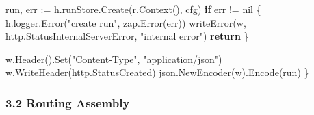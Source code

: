 \documentclass[
]{article}
\newenvironment{Shaded}{}{}
\newcommand{\ControlFlowTok}[1]{\textcolor[rgb]{0.00,0.44,0.13}{\textbf{#1}}}
\newcommand{\NormalTok}[1]{#1}
\newcommand{\OperatorTok}[1]{\textcolor[rgb]{0.40,0.40,0.40}{#1}}
\newcommand{\OtherTok}[1]{\textcolor[rgb]{0.00,0.44,0.13}{#1}}
\newcommand{\StringTok}[1]{\textcolor[rgb]{0.25,0.44,0.63}{#1}}
\begin{document}
\begin{Shaded}
\begin{Highlighting}[]
\NormalTok{    run}\OperatorTok{,}\NormalTok{ err }\OperatorTok{:=}\NormalTok{ h}\OperatorTok{.}\NormalTok{runStore}\OperatorTok{.}\NormalTok{Create}\OperatorTok{(}\NormalTok{r}\OperatorTok{.}\NormalTok{Context}\OperatorTok{(),}\NormalTok{ cfg}\OperatorTok{)}
    \ControlFlowTok{if}\NormalTok{ err }\OperatorTok{!=} \OtherTok{nil} \OperatorTok{\{}
\NormalTok{        h}\OperatorTok{.}\NormalTok{logger}\OperatorTok{.}\NormalTok{Error}\OperatorTok{(}\StringTok{"create run"}\OperatorTok{,}\NormalTok{ zap}\OperatorTok{.}\NormalTok{Error}\OperatorTok{(}\NormalTok{err}\OperatorTok{))}
\NormalTok{        writeError}\OperatorTok{(}\NormalTok{w}\OperatorTok{,}\NormalTok{ http}\OperatorTok{.}\NormalTok{StatusInternalServerError}\OperatorTok{,} \StringTok{"internal error"}\OperatorTok{)}
        \ControlFlowTok{return}
    \OperatorTok{\}}

\NormalTok{    w}\OperatorTok{.}\NormalTok{Header}\OperatorTok{().}\NormalTok{Set}\OperatorTok{(}\StringTok{"Content{-}Type"}\OperatorTok{,} \StringTok{"application/json"}\OperatorTok{)}
\NormalTok{    w}\OperatorTok{.}\NormalTok{WriteHeader}\OperatorTok{(}\NormalTok{http}\OperatorTok{.}\NormalTok{StatusCreated}\OperatorTok{)}
\NormalTok{    json}\OperatorTok{.}\NormalTok{NewEncoder}\OperatorTok{(}\NormalTok{w}\OperatorTok{).}\NormalTok{Encode}\OperatorTok{(}\NormalTok{run}\OperatorTok{)}
\OperatorTok{\}}
\end{Highlighting}
\end{Shaded}

\hypertarget{routing-assembly}{%
\subsubsection{3.2 Routing Assembly}\label{routing-assembly}}
\end{document}

